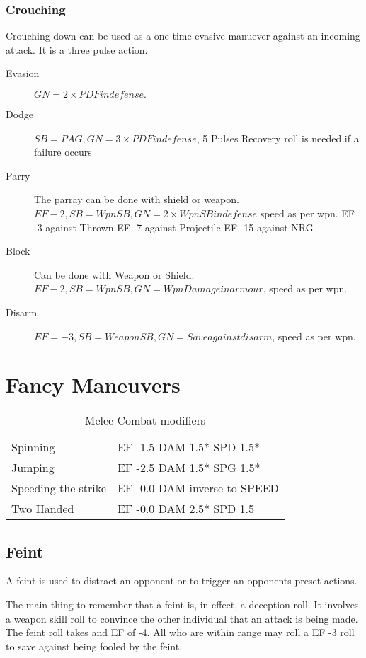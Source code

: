 \subsubsection{Crouching}
Crouching down can be used as a one time evasive manuever against an
incoming attack. It is a three pulse action. 

\begin{description}
	\item[Evasion] 
    \( GN = 2 \times PDF in defense. \)
	\item[Dodge] 
	\( SB = PAG, GN = 3 \times PDF in defense\), 5 Pulses
	Recovery roll is needed if a failure occurs
	\item[Parry] 
	The parray can be done with shield or weapon.
	\( EF -2, SB = Wpn SB, GN = 2 \times Wpn SB in defense\) speed as per wpn.
	EF -3 against Thrown 
	EF -7 against Projectile
	EF -15 against NRG
	\item[Block] 
	Can be done with Weapon or Shield. 
	\( EF -2, SB = Wpn SB, GN = Wpn Damage in armour\), speed as per wpn. 
	\item[Disarm] 
	\( EF = -3, SB = Weapon SB, GN = Save against disarm\), speed as per wpn.
\end{description}
	
\section{Fancy Maneuvers}

\begin{table}[hb]
\centering
\caption{Melee Combat modifiers}
	\begin{tabular}{||l|l||} \hline
	Spinning      &          EF -1.5 DAM 1.5* SPD 1.5* \\
	Jumping       &          EF -2.5 DAM 1.5* SPG 1.5* \\
	Speeding the strike &    EF -0.0 DAM inverse to SPEED  \\
	Two Handed    &          EF -0.0 DAM 2.5* SPD 1.5  \\ \hline
	\end{tabular}
\end{table}

\subsection{Feint}

A feint is used to distract an opponent or to trigger an opponents 
preset actions. 

The main thing to remember that a feint is, in effect, a deception 
roll. It involves a weapon skill roll to convince the other 
individual that an attack is being made. The feint roll takes and EF 
of -4. All who are within range may roll a EF -3 roll to save against 
being fooled by the feint.

